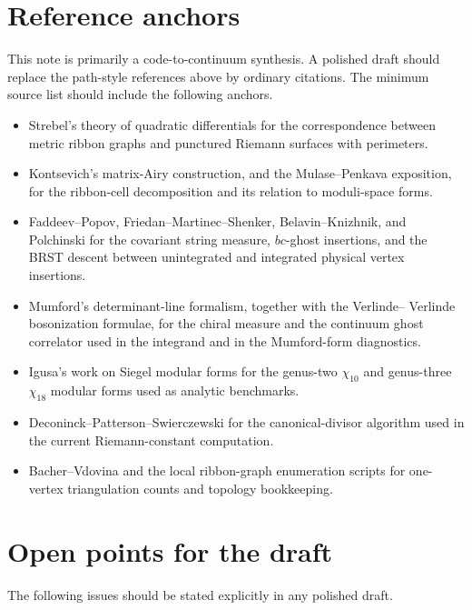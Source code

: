 \documentclass[11pt]{article}
\numberwithin{equation}{section}
\begin{document}
\section{Reference anchors}

This note is primarily a code-to-continuum synthesis.  A polished draft should
replace the path-style references above by ordinary citations.  The minimum
source list should include the following anchors.

\begin{itemize}
\item Strebel's theory of quadratic differentials for the correspondence
between metric ribbon graphs and punctured Riemann surfaces with perimeters.
\item Kontsevich's matrix-Airy construction, and the Mulase--Penkava
exposition, for the ribbon-cell decomposition and its relation to moduli-space
forms.
\item Faddeev--Popov, Friedan--Martinec--Shenker, Belavin--Knizhnik, and
Polchinski for the covariant string measure, \(bc\)-ghost insertions, and the
BRST descent between unintegrated and integrated physical vertex insertions.
\item Mumford's determinant-line formalism, together with the Verlinde--
Verlinde bosonization formulae, for the chiral measure and the continuum ghost
correlator used in the integrand and in the Mumford-form diagnostics.
\item Igusa's work on Siegel modular forms for the genus-two \(\chi_{10}\)
and genus-three \(\chi_{18}\) modular forms used as analytic benchmarks.
\item Deconinck--Patterson--Swierczewski for the canonical-divisor algorithm
used in the current Riemann-constant computation.
\item Bacher--Vdovina and the local ribbon-graph enumeration scripts for
one-vertex triangulation counts and topology bookkeeping.
\end{itemize}

\section{Open points for the draft}

The following issues should be stated explicitly in any polished draft.
\end{document}
